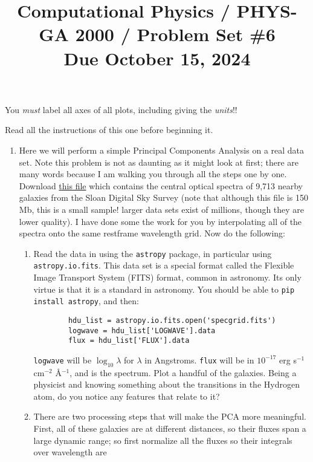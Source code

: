 \documentclass[11pt, preprint]{aastex}
\begin{document}
\title{\bf Computational Physics / PHYS-GA 2000 / Problem Set \#6
\\ Due October 15, 2024 }

You {\it must} label all axes of all plots, including giving the {\it
  units}!!

Read all the instructions of this one before beginning it.

\begin{enumerate}
\item Here we will perform a simple Principal Components Analysis on a
  real data set. Note this problem is not as daunting as it might look
  at first; there are many words because I am walking you through all
  the steps one by one.  Download
  \href{https://www.dropbox.com/scl/fi/9cmawl762qtuwiouhmafs/specgrid.fits?rlkey=d2zcco18t5vfbib5nuxmsu411&dl=0}{this
    file} which contains the central optical spectra of 9,713 nearby
  galaxies from the Sloan Digital Sky Survey (note that although this
  file is 150 Mb, this is a small sample!  larger data sets exist of
  millions, though they are lower quality). I have done some the work
  for you by interpolating all of the spectra onto the same restframe
  wavelength grid. Now do the following:
  \begin{enumerate}
    \item Read the data in using the {\tt astropy} package, in
      particular using {\tt astropy.io.fits}. This data set is a
      special format called the Flexible Image Transport System (FITS)
      format, common in astronomy. Its only virtue is that it is a
      standard in astronomy. You should be able to {\tt pip install
        astropy}, and then:
      \begin{verbatim}
        hdu_list = astropy.io.fits.open('specgrid.fits')
        logwave = hdu_list['LOGWAVE'].data
        flux = hdu_list['FLUX'].data
      \end{verbatim}
      {\tt logwave} will be $\log_{10}\lambda$ for $\lambda$ in
      Angstroms. {\tt flux} will be in $10^{-17}$ erg s$^{-1}$
      cm$^{-2}$ \AA$^{-1}$, and is the spectrum. Plot a handful of the
      galaxies. Being a physicist and knowing something about the
      transitions in the Hydrogen atom, do you notice any features
      that relate to it?
    \item There are two processing steps that will make the PCA more
      meaningful. First, all of these galaxies are at different
      distances, so their fluxes span a large dynamic range; so first
      normalize all the fluxes so their integrals over wavelength are

\end{enumerate}
\end{enumerate}
\end{document}
